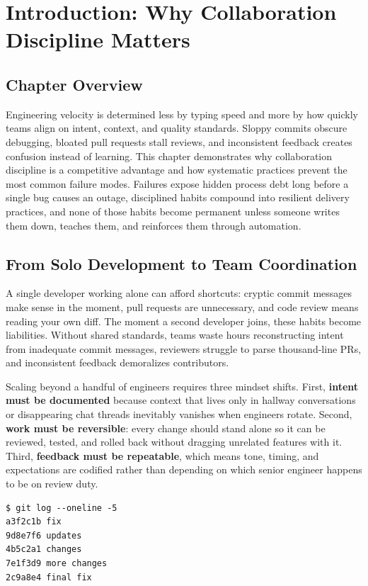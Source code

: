 \chapter{Introduction: Why Collaboration Discipline Matters}

\section{Chapter Overview}
Engineering velocity is determined less by typing speed and more by how quickly teams align on intent, context, and quality standards. Sloppy commits obscure debugging, bloated pull requests stall reviews, and inconsistent feedback creates confusion instead of learning. This chapter demonstrates why collaboration discipline is a competitive advantage and how systematic practices prevent the most common failure modes. Failures expose hidden process debt long before a single bug causes an outage, disciplined habits compound into resilient delivery practices, and none of those habits become permanent unless someone writes them down, teaches them, and reinforces them through automation.

\section{From Solo Development to Team Coordination}
A single developer working alone can afford shortcuts: cryptic commit messages make sense in the moment, pull requests are unnecessary, and code review means reading your own diff. The moment a second developer joins, these habits become liabilities. Without shared standards, teams waste hours reconstructing intent from inadequate commit messages, reviewers struggle to parse thousand-line PRs, and inconsistent feedback demoralizes contributors.

Scaling beyond a handful of engineers requires three mindset shifts. First, \textbf{intent must be documented} because context that lives only in hallway conversations or disappearing chat threads inevitably vanishes when engineers rotate. Second, \textbf{work must be reversible}: every change should stand alone so it can be reviewed, tested, and rolled back without dragging unrelated features with it. Third, \textbf{feedback must be repeatable}, which means tone, timing, and expectations are codified rather than depending on which senior engineer happens to be on review duty.

\begin{lstlisting}[style=shell,caption={Ad-hoc collaboration: every contributor invents their own pattern}]
$ git log --oneline -5
a3f2c1b fix
9d8e7f6 updates
4b5c2a1 changes
7e1f3d9 more changes
2c9a8e4 final fix
\end{lstlisting}


